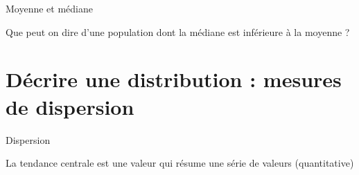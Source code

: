 \documentclass{beamer}
\begin{document}
\begin{frame}{Moyenne et médiane}

Que peut on dire d'une population dont la médiane est inférieure à la moyenne ? 

\end{frame}




\section{Décrire une distribution : mesures de \alert{dispersion}}

\begin{frame}{Dispersion}


La tendance centrale est \alert{une} valeur qui \alert{résume} une série de valeurs (quantitative)


\end{frame}
\end{document}
